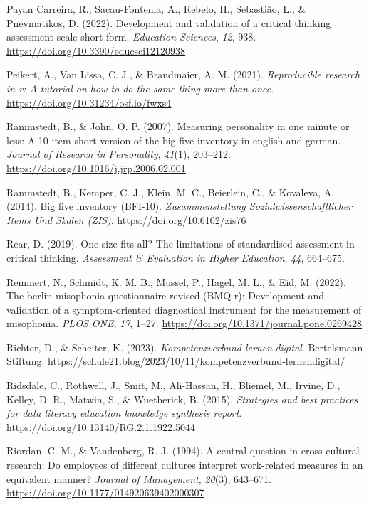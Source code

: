 \documentclass[
  12pt,
  a4paper,
  twoside]{article}
\newlength{\cslhangindent}
\newenvironment{CSLReferences}[2] %
 {\begin{list}{}{%
  \setlength{\itemindent}{0pt}
  \setlength{\leftmargin}{0pt}
  \setlength{\parsep}{0pt}
  \ifodd #1
   \setlength{\leftmargin}{\cslhangindent}
   \setlength{\itemindent}{-1\cslhangindent}
  \fi
  \setlength{\itemsep}{#2\baselineskip}}}
 {\end{list}}
\begin{document}
\begin{CSLReferences}{1}{0}
Payan Carreira, R., Sacau-Fontenla, A., Rebelo, H., Sebastião, L., \& Pnevmatikos, D. (2022). Development and validation of a critical thinking assessment-scale short form. \emph{Education Sciences}, \emph{12}, 938. \url{https://doi.org/10.3390/educsci12120938}

Peikert, A., Van Lissa, C. J., \& Brandmaier, A. M. (2021). \emph{Reproducible research in r: A tutorial on how to do the same thing more than once}. \url{https://doi.org/10.31234/osf.io/fwxs4}

Rammstedt, B., \& John, O. P. (2007). Measuring personality in one minute or less: A 10-item short version of the big five inventory in english and german. \emph{Journal of Research in Personality}, \emph{41}(1), 203--212. \url{https://doi.org/10.1016/j.jrp.2006.02.001}

Rammstedt, B., Kemper, C. J., Klein, M. C., Beierlein, C., \& Kovaleva, A. (2014). Big five inventory (BFI-10). \emph{Zusammenstellung Sozialwissenschaftlicher Items Und Skalen (ZIS)}. \url{https://doi.org/10.6102/zis76}

Rear, D. (2019). One size fits all? The limitations of standardised assessment in critical thinking. \emph{Assessment \& Evaluation in Higher Education}, \emph{44}, 664--675.

Remmert, N., Schmidt, K. M. B., Mussel, P., Hagel, M. L., \& Eid, M. (2022). The berlin misophonia questionnaire revised (BMQ-r): Development and validation of a symptom-oriented diagnostical instrument for the measurement of misophonia. \emph{PLOS ONE}, \emph{17}, 1--27. \url{https://doi.org/10.1371/journal.pone.0269428}

Richter, D., \& Scheiter, K. (2023). \emph{Kompetenzverbund lernen.digital}. Bertelsmann Stiftung. \url{https://schule21.blog/2023/10/11/kompetenzverbund-lernendigital/}

Ridsdale, C., Rothwell, J., Smit, M., Ali-Hassan, H., Bliemel, M., Irvine, D., Kelley, D. R., Matwin, S., \& Wuetherick, B. (2015). \emph{Strategies and best practices for data literacy education knowledge synthesis report}. \url{https://doi.org/10.13140/RG.2.1.1922.5044}

Riordan, C. M., \& Vandenberg, R. J. (1994). A central question in cross-cultural research: Do employees of different cultures interpret work-related measures in an equivalent manner? \emph{Journal of Management}, \emph{20}(3), 643--671. \url{https://doi.org/10.1177/014920639402000307}


\end{CSLReferences}
\end{document}
